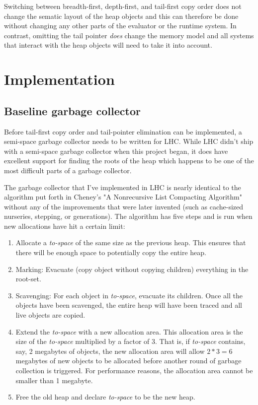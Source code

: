 \documentclass[a4paper,oneside]{memoir}
\begin{document}
Switching between breadth-first, depth-first, and tail-first copy order does not
change the sematic layout of the heap objects and this can therefore be done
without changing any other parts of the evaluator or the runtime system. In
contrast, omitting the tail pointer \emph{does} change the memory model and
all systems that interact with the heap objects will need to take it into
account.

\section{Implementation}

\subsection{Baseline garbage collector}

Before tail-first copy order and tail-pointer elimination can be implemented,
a semi-space garbage collector needs to be written for LHC. While LHC didn't
ship with a semi-space garbage collector when this project began, it does have
excellent support for finding the roots of the heap which happens to be one of
the most difficult parts of a garbage collector.

The garbage collector that I've implemented in LHC is nearly identical to the
algorithm put forth in Cheney's "A Nonrecursive List Compacting Algorithm"
without any of the improvements that were later invented (such as cache-sized
nurseries, stepping, or generations). The algorithm has five steps and is run
when new allocations have hit a certain limit:
\begin{enumerate}
  \item Allocate a \emph{to-space} of the same size as the previous heap. This
  ensures that there will be enough space to potentially copy the entire heap.
  \item Marking: Evacuate (copy object without copying children) everything in the root-set.
  \item Scavenging: For each object in \emph{to-space}, evacuate its children. Once all
  the objects have been scavenged, the entire heap will have been traced and all
  live objects are copied.
  \item Extend the \emph{to-space} with a new allocation area. This allocation
  area is the size of the \emph{to-space} multiplied by a factor of 3. That is,
  if \emph{to-space} contains, say, 2 megabytes of objects, the new allocation
  area will allow $2*3=6$ megabytes of new objects to be allocated before another
  round of garbage collection is triggered. For performance reasons, the allocation
  area cannot be smaller than 1 megabyte.
  \item Free the old heap and declare \emph{to-space} to be the new heap.
\end{enumerate}
\end{document}
